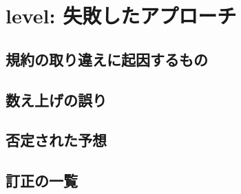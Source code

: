 
\section{level: 失敗したアプローチ}

\subsection{規約の取り違えに起因するもの}

\subsection{数え上げの誤り}

\subsection{否定された予想}

\subsection{訂正の一覧}
